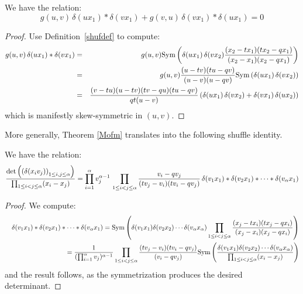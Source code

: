 \begin{thm}
We have the relation:
$$g(u,v)\, \delta(u x_1)*\delta(v x_1)+g(v,u)\, \delta(v x_1)*\delta(u x_1)=0$$
\end{thm}
\begin{proof}
Use Definition~\ref{shufdef} to compute:
\begin{eqnarray*}
g(u,v)\, \delta(u x_1)*\delta(v x_1)&=&
g(u,v){\rm Sym}\left( \delta(u x_1)\,\delta(v x_2)\frac{(x_2-tx_1)(t x_2-q x_1)}{(x_2-x_1)(x_2-q x_1)} \right)\\
&=& g(u,v)\frac{(u-tv)(t u-q v)}{(u-v)(u-q v)}{\rm Sym}\left( \delta(u x_1)\,\delta(v x_2) \right)\\
&=& \frac{(v-t u)(u-tv)(t v-q u)(t u-q v)}{q t (u-v)}\left( \delta(u x_1)\,\delta(v x_2)+\delta(v x_1)\,\delta(u x_2)\right)
\end{eqnarray*}
which is manifestly skew-symmetric in $(u,v)$.
\end{proof}

More generally, Theorem \ref{Mofm} translates into the following shuffle identity.
\begin{thm}\label{detshuf}
We have the relation:
$$\frac{\det\left(\left(\delta(x_i v_j)\right)_{1\leq i,j\leq {\alpha}}\right)}{\prod_{1\leq i<j\leq {\alpha}} (x_i-x_j)}
=\prod_{i=1}^{\alpha} v_j^{{\alpha}-1}\,
\prod_{1\leq i<j\leq {\alpha}} \frac{v_i-q v_j}{(t v_j -v_i)(t v_i-q v_j)}\, \delta(v_1x_1)*\delta(v_2 x_1)*\cdots *\delta(v_{\alpha} x_1)$$
\end{thm}
\begin{proof}
We compute:
\begin{eqnarray*}
&&\delta(v_1x_1)*\delta(v_2 x_1)*\cdots *\delta(v_{\alpha} x_1)={\rm Sym}\left(
\delta(v_1x_1)\delta(v_2 x_2)\cdots\delta(v_{\alpha} x_{\alpha})\prod_{1\leq i<j\leq {\alpha}}\frac{(x_j-tx_i)(t x_j-q x_i)}{(x_j-x_i)(x_j-q x_i)}\right)\\
&&\qquad\qquad =\frac{1}{(\prod_{i=1}^{\alpha} v_j)^{{\alpha}-1}} \prod_{1\leq i<j\leq {\alpha}}\frac{(tv_j-v_i)(t v_i-q v_j)}{(v_i-q v_j)} {\rm Sym}\left(
\frac{\delta(v_1x_1)\delta(v_2 x_2)\cdots\delta(v_{\alpha} x_{\alpha})}{\prod_{1\leq i<j\leq {\alpha}} (x_i-x_j)}\right)
\end{eqnarray*}
and the result follows, as the symmetrization produces the desired determinant.
\end{proof}

